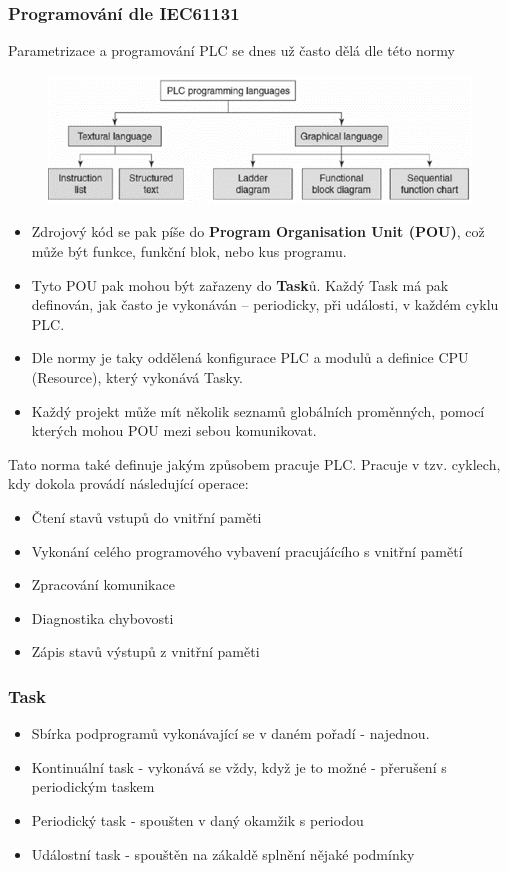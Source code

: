 \subsubsection*{Programování dle IEC61131}
Parametrizace a programování PLC se dnes už často dělá dle této normy

\begin{figure}[h]
  \begin{center}
    \includegraphics[scale = 1]{img/Picture14.png}
  \end{center}
\end{figure}

\begin{itemize}
  \item Zdrojový kód se pak píše do \textbf{Program Organisation Unit (POU)}, což může být funkce, funkční blok, nebo kus programu.
  \item Tyto POU pak mohou být zařazeny do \textbf{Task}ů. Každý Task má pak definován, jak často je vykonáván – periodicky, při události, v každém cyklu PLC. 
  \item Dle normy je taky oddělená konfigurace PLC a modulů a definice CPU (Resource), který vykonává Tasky.
  \item Každý projekt může mít několik seznamů globálních proměnných, pomocí kterých mohou POU mezi sebou komunikovat.  
\end{itemize}

Tato norma také definuje jakým způsobem pracuje PLC. Pracuje v tzv. cyklech, kdy dokola provádí následující operace:
\begin{itemize}
  \item Čtení stavů vstupů do vnitřní paměti
  \item Vykonání celého programového vybavení pracujáícího s vnitřní pamětí
  \item Zpracování komunikace
  \item Diagnostika chybovosti
  \item Zápis stavů výstupů z vnitřní paměti
\end{itemize}

\subsubsection*{Task}
\begin{itemize}
  \item Sbírka podprogramů vykonávající se v daném pořadí - najednou.
  \item Kontinuální task - vykonává se vždy, když je to možné - přerušení s periodickým taskem
  \item Periodický task - spoušten v daný okamžik s periodou
  \item Událostní task - spouštěn na zákaldě splnění nějaké podmínky
\end{itemize}

